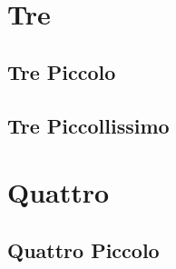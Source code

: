 \documentclass{article}
\begin{document}


{ }


  
{\vspace*{1cm}} \section{Tre}

\subsection{Tre Piccolo}
%
%



\subsection{Tre Piccollissimo}

{ }



 
{\vspace*{1cm}} \section{Quattro}

{ }

\subsection{Quattro Piccolo}

{ }

 

  
\end{document}
